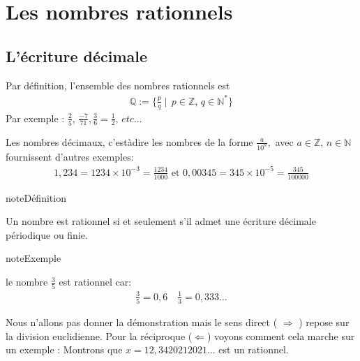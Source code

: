 \documentclass[letterpaper,10pt,french]{jupyterBook}
\begin{document}
\section{Les nombres rationnels}
\label{\detokenize{rationnels:les-nombres-rationnels}}\label{\detokenize{rationnels::doc}}

\subsection{L’écriture décimale}
\label{\detokenize{rationnels:l-ecriture-decimale}}
\sphinxAtStartPar
Par définition, l’ensemble des nombres rationnels est
\begin{equation*}
\begin{split}
\mathbb{Q}:=\{\frac{p}{q}\mid\, p\in \mathbb{Z},\,q\in \mathbb{N}^{*}\}
\end{split}
\end{equation*}
\sphinxAtStartPar
Par exemple : \(\frac{2}{5},\,\frac{-7}{71},\frac{3}{6}=\frac{1}{2},\,etc...\)

\sphinxAtStartPar
Les nombres décimaux, c’est\sphinxhyphen{}à\sphinxhyphen{}dire les nombres de la forme \(\frac{a}{10^{n}},\)  avec \(a\in \mathbb{Z}\), \(n\in \mathbb{N}\) fournissent d’autres exemples:
\begin{equation*}
\begin{split}
1,234 = 1234\times 10^{-3} =\frac{1234}{1000} \mbox{ et }
0,00345 = 345\times 10^{-5}=\frac{345}{100000}
\end{split}
\end{equation*}
\begin{sphinxadmonition}{note}{Définition}

\sphinxAtStartPar
Un nombre est rationnel si et seulement s’il admet une écriture décimale périodique ou finie.
\end{sphinxadmonition}

\begin{sphinxadmonition}{note}{Exemple}

\sphinxAtStartPar
le nombre \(\frac{3}{5}\) est rationnel car:
\begin{equation*}
\begin{split}
\frac{3}{5}=0,6\quad \frac{1}{3}=0,333\ldots
\end{split}
\end{equation*}\end{sphinxadmonition}

\sphinxAtStartPar
Nous n’allons pas donner la démonstration mais le sens direct ( \(\Rightarrow\) ) repose sur la division euclidienne. Pour la réciproque (\(\Leftarrow\)) voyons comment cela marche sur un exemple : Montrons que \(x = 12,34 2021 2021\ldots\) est un rationnel.
\end{document}
